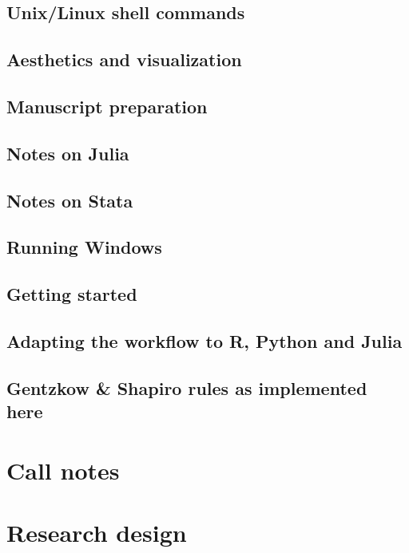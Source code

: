 \documentclass{report}
\numberwithin{equation}{section}
\numberwithin{figure}{section}
\numberwithin{table}{section}
\begin{document}
\section{Unix/Linux shell commands} 
\section{Aesthetics and visualization} 
\section{Manuscript preparation} 
\section{Notes on Julia} 
\section{Notes on Stata} 
\section{Running Windows} 

\section{Getting started} 

\section{Adapting the workflow to R, Python and Julia} 
\section{Gentzkow \& Shapiro rules as implemented here} 

\chapter{Call notes}

\chapter{Research design}
\end{document}
